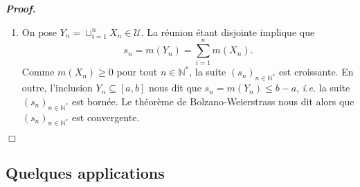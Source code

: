 \documentclass[11pt,a4paper]{article}
\newcommand{\NN}{\mathbb{N}}
\newenvironment{preuve}[1][]
{\vskip 2mm  \noindent\emph{\bf Proof#1. }}{$\Box$ \vskip 2mm}
\let\geq\geqslant
\let\leq\leqslant
\newcounter{exercice}
\def\exo#1{\vspace{.2cm}\textbf{Exercice\addtocounter{exercice}{1}
		\arabic{exercice} {\it #1}} }
\begin{document}
\begin{preuve}
\begin{enumerate}
		\item On pose $Y_{n} = \sqcup_{i=1}^{n} X_{n} \in \mathcal{U}$. 
		La réunion étant disjointe implique que 
		\[     s_{n} = m(Y_{n}) = \sum_{i=1}^{n} m(X_{n}).     \]
		Comme $m(X_{n}) \geq 0$ pour tout $n \in \NN^{*}$, la suite $(s_{n})_{n \in \NN^{*}}$ est croissante. 
		En outre, l'inclusion $Y_{n} \subseteq [a,b]$ nous dit que $s_{n} = m(Y_{n}) \leq b-a$, \textit{i.e.} la suite 
		$(s_{n})_{n \in \NN^{*}}$ est bornée. 
		Le théorème de Bolzano-Weierstrass nous dit alors que $(s_{n})_{n \in \NN^{*}}$ est convergente. 
	\end{enumerate}
\end{preuve}





\subsection{Quelques applications}
\end{document}
